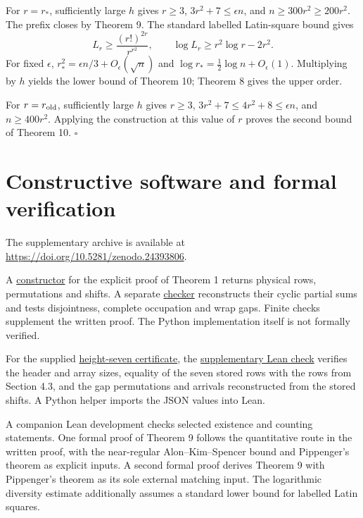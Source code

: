 \documentclass[11pt,a4paper]{article}
\begin{document}
For \(r=r_*\), sufficiently large \(h\) gives \(r\geq3\), \(3r^2+7\leq\epsilon n\), and \(n\geq300r^2\geq200r^2\). The prefix closes by Theorem 9. The standard labelled Latin-square bound \cite[p.~343]{MW05} gives \[
 L_r\geq\frac{(r!)^{2r}}{r^{r^2}},\qquad
 \log L_r\geq r^2\log r-2r^2.
\] For fixed \(\epsilon\), \(r_*^2=\epsilon n/3+O_\epsilon(\sqrt n)\) and \(\log r_*=\tfrac12\log n+O_\epsilon(1)\). Multiplying by \(h\) yields the lower bound of Theorem 10; Theorem 8 gives the upper order.

For \(r=r_{\rm old}\), sufficiently large \(h\) gives \(r\geq3\), \(3r^2+7\leq4r^2+8\leq\epsilon n\), and \(n\geq400r^2\). Applying the construction at this value of \(r\) proves the second bound of Theorem 10. \(\square\)

\hypertarget{constructive-software-and-formal-verification}{%
\section{Constructive software and formal verification}\label{constructive-software-and-formal-verification}}

The supplementary archive is available at \url{https://doi.org/10.5281/zenodo.24393806}.

A \href{supplement/software/construct.py}{constructor} for the explicit proof of Theorem 1 returns physical rows, permutations and shifts. A separate \href{supplement/software/verify.py}{checker} reconstructs their cyclic partial sums and tests disjointness, complete occupation and wrap gaps. Finite checks supplement the written proof. The Python implementation itself is not formally verified.

For the supplied \href{supplement/examples/height-seven.json}{height-seven certificate}, the \href{supplement/formal/README.md}{supplementary Lean check} verifies the header and array sizes, equality of the seven stored rows with the rows from Section 4.3, and the gap permutations and arrivals reconstructed from the stored shifts. A Python helper imports the JSON values into Lean.

A companion Lean development checks selected existence and counting statements. One formal proof of Theorem 9 follows the quantitative route in the written proof, with the near-regular Alon--Kim--Spencer bound and Pippenger's theorem as explicit inputs. A second formal proof derives Theorem 9 with Pippenger's theorem as its sole external matching input. The logarithmic diversity estimate additionally assumes a standard lower bound for labelled Latin squares.
\end{document}
